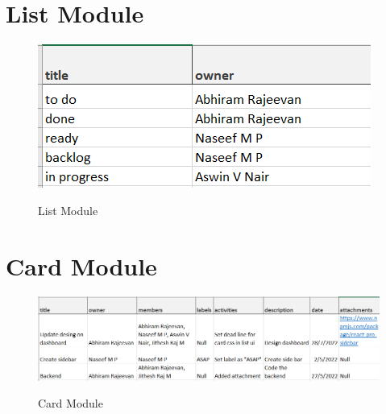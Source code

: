 \section{List Module}
\begin{figure}[!htbp]
    \centering
    \includegraphics[scale = 0.6]{lists.png}\\[0.1in]
    \caption{List Module}
    \label{fig:my_label}
\end{figure}
\FloatBarrier
\section{Card Module}
\begin{figure}[!htbp]
    \centering
    \includegraphics[scale = 0.6]{cards.png}\\[0.1in]
    \caption{Card Module}
    \label{fig:my_label}
\end{figure}
\FloatBarrier



